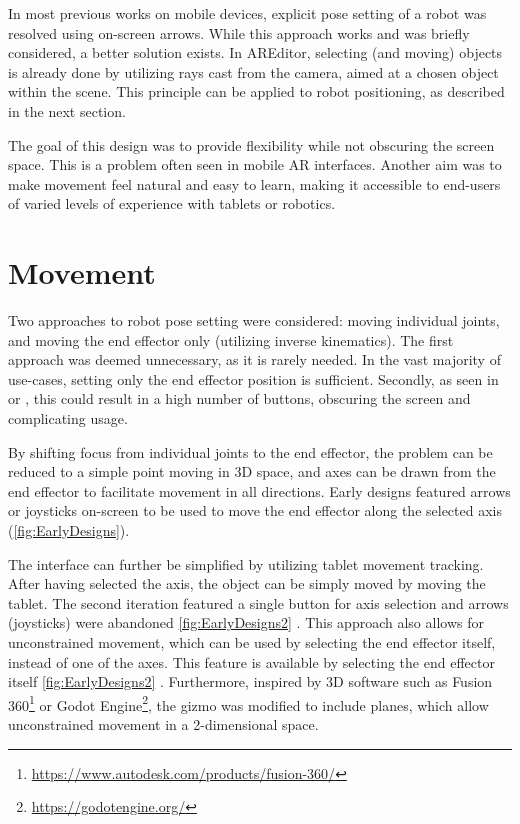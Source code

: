 In most previous works on mobile devices, explicit pose setting of a robot was resolved using on-screen arrows. While this approach works and was briefly considered, a better solution exists. In AREditor, selecting (and moving) objects is already done by utilizing rays cast from the camera, aimed at a chosen object within the scene. This principle can be applied to robot positioning, as described in the next section.

The goal of this design was to provide flexibility while not obscuring the screen space. This is a problem often seen in mobile AR interfaces. Another aim was to make movement feel natural and easy to learn, making it accessible to end-users of varied levels of experience with tablets or robotics.

\section{Movement}
Two approaches to robot pose setting were considered: moving individual joints, and moving the end effector only (utilizing inverse kinematics). The first approach was deemed unnecessary, as it is rarely needed. In the vast majority of use-cases, setting only the end effector position is sufficient. Secondly, as seen in \cite{Zhang2020AugmentedRI} or \cite{Tango}, this could result in a high number of buttons, obscuring the screen and complicating usage.

By shifting focus from individual joints to the end effector, the problem can be reduced to a simple point moving in 3D space, and axes can be drawn from the end effector to facilitate movement in all directions. Early designs featured arrows or joysticks on-screen to be used to move the end effector along the selected axis (\ref{fig:EarlyDesigns}).



The interface can further be simplified by utilizing tablet movement tracking. After having selected the axis, the object can be simply moved by moving the tablet. The second iteration featured a single button for axis selection and arrows (joysticks) were abandoned \ref{fig:EarlyDesigns2} . This approach also allows for unconstrained movement, which can be used by selecting the end effector itself, instead of one of the axes. This feature is available by selecting the end effector itself \ref{fig:EarlyDesigns2} . Furthermore, inspired by 3D software such as Fusion 360\footnote{\href{https://www.autodesk.com/products/fusion-360/}{https://www.autodesk.com/products/fusion-360/}} or Godot Engine\footnote{\href{https://godotengine.org/}{https://godotengine.org/}}, the gizmo was modified to include planes, which allow unconstrained movement in a 2-dimensional space. 

